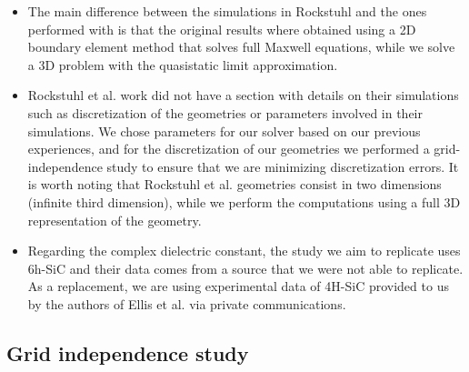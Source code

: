 \begin{itemize}

\item {The main difference between the simulations in Rockstuhl and the ones performed with \pygbe is that the original results where obtained 
using a 2D boundary element method that solves full Maxwell equations, while we solve a 3D problem with the quasistatic limit approximation.}

\item{Rockstuhl et al. work did not have a section with details on their simulations such as discretization of the geometries or parameters 
involved in their simulations. We chose parameters for our solver based on our previous experiences, and for the discretization of our 
geometries we performed a grid-independence study to ensure that we are minimizing discretization errors. It is worth noting that Rockstuhl
et al. geometries consist in two dimensions (infinite third dimension), while we perform the computations using a full 3D representation of the geometry.} 

\item {Regarding the complex dielectric constant, the study we aim to replicate uses 6h-SiC and their data comes from a source that we were not able
to replicate. As a replacement, we are using experimental data of 4H-SiC provided to us by the authors of Ellis et al. \cite{ellis2016} via 
private communications.}

\end{itemize}

\subsection{Grid independence study} \label{ssec:grid_indep_rock}

